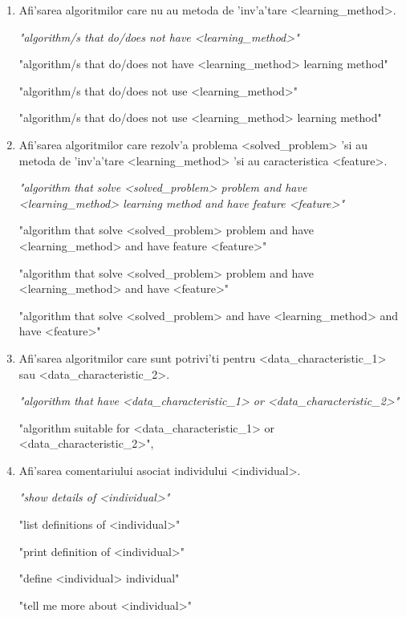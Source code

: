 \begin{enumerate}
{\it
    "what is <individual>"
    
    "<individual> type"
    
    "<individual> class"
    
    "type of <individual>"
    
    "class of <individual>"
 }   
\item Afi'sarea algoritmilor care nu au metoda de 'inv'a'tare <learning\_method>.

{\it
    "algorithm/s that do/does not have <learning\_method>"
    
    "algorithm/s that do/does not have <learning\_method> learning method"
    
    "algorithm/s that do/does not use <learning\_method>"
        
    "algorithm/s that do/does not use <learning\_method> learning method"
 }  

\item Afi'sarea algoritmilor care rezolv'a problema <solved\_problem> 'si au metoda de 'inv'a'tare <learning\_method> 'si au caracteristica <feature>.

{\it
    "algorithm that solve <solved\_problem> problem and have <learning\_method> learning method and have feature  <feature>"
    
    "algorithm that solve <solved\_problem> problem and have <learning\_method> and have feature  <feature>"
    
    "algorithm that solve <solved\_problem> problem and have <learning\_method> and have  <feature>"
    
    "algorithm that solve <solved\_problem> and have <learning\_method> and have  <feature>"
}


\item Afi'sarea algoritmilor care sunt potrivi'ti pentru <data\_characteristic\_1> sau <data\_characteristic\_2>.

{\it
    "algorithm that have  <data\_characteristic\_1> or <data\_characteristic\_2>"
    
    "algorithm suitable for <data\_characteristic\_1> or <data\_characteristic\_2>",
}

\item Afi'sarea comentariului asociat individului <individual>.

{\it
    "show details of <individual>"
    
    "list definitions of <individual>"
    
    "print definition of <individual>"
    
    "define <individual> individual"
    
    "tell me more about <individual>"
}
\end{enumerate}

